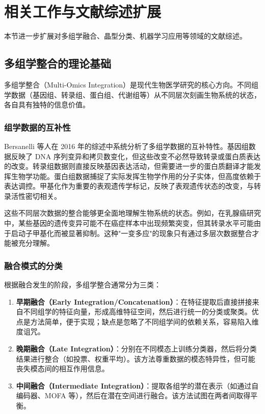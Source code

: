 \section{相关工作与文献综述扩展}

本节进一步扩展对多组学融合、晶型分类、机器学习应用等领域的文献综述。

\subsection{多组学整合的理论基础}

多组学整合（Multi-Omics Integration）是现代生物医学研究的核心方向。不同组学数据（基因组、转录组、蛋白组、代谢组等）从不同层次刻画生物系统的状态，各自具有独特的信息价值。

\subsubsection{组学数据的互补性}

Bersanelli 等人在 2016 年的综述中系统分析了多组学数据的互补特性。基因组数据反映了 DNA 序列变异和拷贝数变化，但这些改变不必然导致转录或蛋白质表达的改变。转录组数据则直接反映基因表达活动，但需要进一步的蛋白质翻译才能发挥生物学功能。蛋白组数据捕捉了实际发挥生物学作用的分子实体，但高度依赖于表达调控。甲基化作为重要的表观遗传学标记，反映了表观遗传状态的改变，与转录活性密切相关。

这些不同层次数据的整合能够更全面地理解生物系统的状态。例如，在乳腺癌研究中，某些基因的遗传变异可能不在癌症样本中出现频繁突变，但其转录水平可能由于启动子甲基化而被显著抑制。这种"一变多应"的现象只有通过多层次数据整合才能被充分理解。

\subsubsection{融合模式的分类}

根据融合发生的阶段，多组学整合通常分为三类：

\begin{enumerate}
    \item \textbf{早期融合（Early Integration/Concatenation）}：在特征提取后直接拼接来自不同组学的特征向量，形成高维特征空间，然后进行统一的分类或聚类。优点是方法简单，便于实现；缺点是忽略了不同组学间的依赖关系，容易陷入维度诅咒。
    
    \item \textbf{晚期融合（Late Integration）}：分别在不同模态上训练分类器，然后将分类结果进行整合（如投票、权重平均）。该方法尊重数据的模态特异性，但可能丧失模态间的相互作用信息。
    
    \item \textbf{中间融合（Intermediate Integration）}：提取各组学的潜在表示（如通过自编码器、MOFA 等），然后在潜在空间进行融合。该方法试图在两者间取得平衡。
\end{enumerate}

